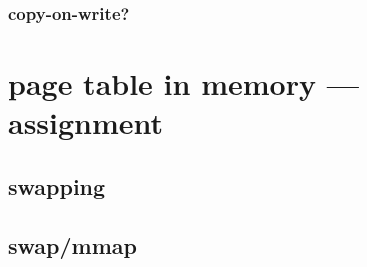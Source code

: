



\subsubsection{copy-on-write?} %


\section{page table in memory --- assignment}


\subsection{swapping}






\subsection{swap/mmap}

